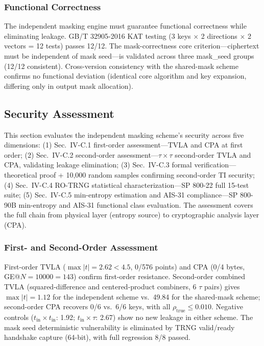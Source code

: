\documentclass[journal]{IEEEtran}
\begin{document}
\subsubsection{Functional Correctness}

The independent masking engine must guarantee functional correctness while eliminating leakage. GB/T 32905-2016 KAT testing (3 keys $\times$ 2 directions $\times$ 2 vectors = 12 tests) passes 12/12. The mask-correctness core criterion---ciphertext must be independent of mask seed---is validated across three mask\_seed groups (12/12 consistent). Cross-version consistency with the shared-mask scheme confirms no functional deviation (identical core algorithm and key expansion, differing only in output mask allocation).

\subsection{Security Assessment}

This section evaluates the independent masking scheme's security across five dimensions: (1) Sec.~IV-C.1 first-order assessment---TVLA and CPA at first order; (2) Sec.~IV-C.2 second-order assessment---$\tau\times\tau$ second-order TVLA and CPA, validating leakage elimination; (3) Sec.~IV-C.3 formal verification---theoretical proof + 10,000 random samples confirming second-order TI security; (4) Sec.~IV-C.4 RO-TRNG statistical characterization---SP 800-22 full 15-test suite; (5) Sec.~IV-C.5 min-entropy estimation and AIS-31 compliance---SP 800-90B min-entropy and AIS-31 functional class evaluation. The assessment covers the full chain from physical layer (entropy source) to cryptographic analysis layer (CPA).

\subsubsection{First- and Second-Order Assessment}

First-order TVLA ($\max|t|=2.62 < 4.5$, 0/576 points) and CPA (0/4 bytes, GE@$\mathit{N=10000}=143$) confirm first-order resistance. Second-order combined TVLA (squared-difference and centered-product combiners, 6 $\tau$ pairs) gives $\max|t|=1.12$ for the independent scheme vs.\ 49.84 for the shared-mask scheme; second-order CPA recovers 0/6 vs.\ 6/6 keys, with all $\rho_{\text{true}} \le 0.010$. Negative controls ($t_{\text{in}}\times t_{\text{in}}$: 1.92; $t_{\text{in}}\times\tau$: 2.67) show no new leakage in either scheme. The mask seed deterministic vulnerability is eliminated by TRNG valid/ready handshake capture (64-bit), with full regression 8/8 passed.
\end{document}
